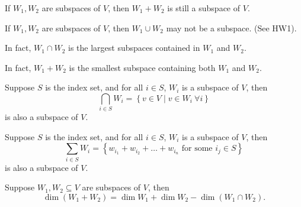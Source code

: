 \begin{theorem} \label{thm: W1 plus W2 is subspace}
    If \(W_1, W_2\) are subspaces of \(V\), then \(W_1 + W_2\) is still a subspace of \(V\).    
\end{theorem}

\begin{remark}
    If \(W_1, W_2\) are subspaces of \(V\), then \(W_1 \cup W_2\) may not be a subspace. (See HW1). 
\end{remark}

\begin{remark}
    In fact, \(W_1 \cap W_2\) is the largest subspaces contained in \(W_1\) and \(W_2\).   
\end{remark}

\begin{remark}
    In fact, \(W_1 + W_2\) is the smallest subspace containing both \(W_1\) and \(W_2\).   
\end{remark}

\begin{corollary}
    Suppose \(S\) is the index set, and for all \(i \in S\), \(W_i\) is a subspace of \(V\), then 
    \[
        \bigcap_{i \in S} W_i = \left\{ v \in V \mid v \in W_i \ \forall i \right\}  
    \] is also a subspace of \(V\). 
\end{corollary}

\begin{corollary}
    Suppose \(S\) is the index set, and for all \(i \in S\), \(W_i\) is a subspace of \(V\), then 
    \[
        \sum_{i \in S} W_i = \left\{ w_{i_1} + w_{i_2} + \dots + w_{i_n} \text{ for some } i_j \in S \right\}  
    \] is also a subspace of \(V\).  
\end{corollary}

\begin{proposition} \label{prop: dimension theorem}
   Suppose \(W_1, W_2 \subseteq V\) are subspaces of \(V\), then 
   \[
    \dim (W_1 + W_2) = \dim W_1 + \dim W_2 - \dim (W_1 \cap W_2).
   \]  
\end{proposition}